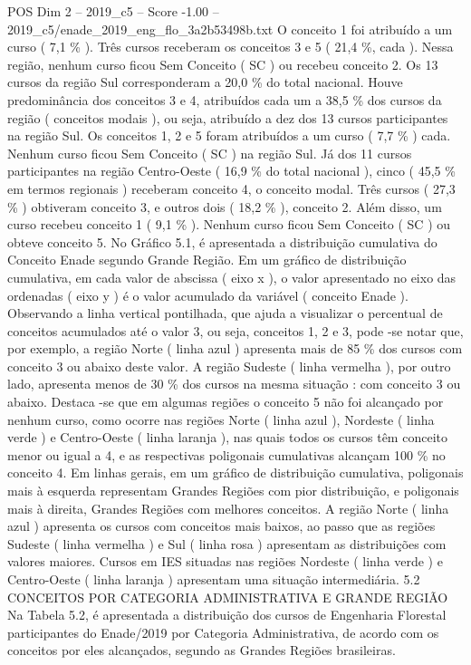 \begin{textsample}{POS Dim 2 – 2019\_c5 – Score -1.00 – 2019\_c5/enade\_2019\_eng\_flo\_3a2b53498b.txt}
O conceito 1 foi atribuído a um curso ( 7,1 \% ).
Três cursos receberam os conceitos 3 e 5 ( 21,4 \%, cada ).
Nessa região, nenhum curso ficou Sem Conceito ( SC ) ou recebeu conceito 2.
Os 13 cursos da região Sul corresponderam a 20,0 \% do total nacional.
Houve predominância dos conceitos 3 e 4, atribuídos cada um a 38,5 \% dos cursos da região ( conceitos modais ), ou seja, atribuído a dez dos 13 cursos participantes na região Sul.
Os conceitos 1, 2 e 5 foram atribuídos a um curso ( 7,7 \% ) cada.
Nenhum curso ficou Sem Conceito ( SC ) na região Sul.
Já dos 11 cursos participantes na região Centro-Oeste ( 16,9 \% do total nacional ), cinco ( 45,5 \% em termos regionais ) receberam conceito 4, o conceito modal.
Três cursos ( 27,3 \% ) obtiveram conceito 3, e outros dois ( 18,2 \% ), conceito 2.
Além disso, um curso recebeu conceito 1 ( 9,1 \% ).
Nenhum curso ficou Sem Conceito ( SC ) ou obteve conceito 5.
No Gráfico 5.1, é apresentada a distribuição cumulativa do Conceito Enade segundo Grande Região.
Em um gráfico de distribuição cumulativa, em cada valor de abscissa ( eixo x ), o valor apresentado no eixo das ordenadas ( eixo y ) é o valor acumulado da variável ( conceito Enade ).
Observando a linha vertical pontilhada, que ajuda a visualizar o percentual de conceitos acumulados até o valor 3, ou seja, conceitos 1, 2 e 3, pode -se notar que, por exemplo, a região Norte ( linha azul ) apresenta mais de 85 \% dos cursos com conceito 3 ou abaixo deste valor.
A região Sudeste ( linha vermelha ), por outro lado, apresenta menos de 30 \% dos cursos na mesma situação : com conceito 3 ou abaixo.
Destaca -se que em algumas regiões o conceito 5 não foi alcançado por nenhum curso, como ocorre nas regiões Norte ( linha azul ), Nordeste ( linha verde ) e Centro-Oeste ( linha laranja ), nas quais todos os cursos têm conceito menor ou igual a 4, e as respectivas poligonais cumulativas alcançam 100 \% no conceito 4.
Em linhas gerais, em um gráfico de distribuição cumulativa, poligonais mais à esquerda representam Grandes Regiões com pior distribuição, e poligonais mais à direita, Grandes Regiões com melhores conceitos.
A região Norte ( linha azul ) apresenta os cursos com conceitos mais baixos, ao passo que as regiões Sudeste ( linha vermelha ) e Sul ( linha rosa ) apresentam as distribuições com valores maiores.
Cursos em IES situadas nas regiões Nordeste ( linha verde ) e Centro-Oeste ( linha laranja ) apresentam uma situação intermediária. 5.2 CONCEITOS POR CATEGORIA ADMINISTRATIVA E GRANDE REGIÃO Na Tabela 5.2, é apresentada a distribuição dos cursos de Engenharia Florestal participantes do Enade/2019 por Categoria Administrativa, de acordo com os conceitos por eles alcançados, segundo as Grandes Regiões brasileiras.

\end{textsample}
